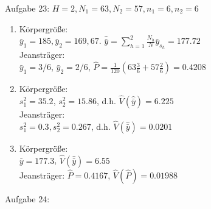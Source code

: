 \begin{Solution}{{Aufgabe 23:}}
$H=2, N_1=63, N_2 = 57, n_1 = 6, n_2 = 6$
\begin{enumerate}
	\item Körpergröße:\\ $\bar{y}_1 = 185, \bar{y}_2 = 169,67$. $\hat{\bar{y}}=\sum_{h=1}^{2}\frac{N_h}{N}\bar{y}_{s_h} = 177.72$\\
	Jeansträger:\\
	$\bar{y}_1=3/6$, $\bar{y}_2=2/6$, $\hat{P}=\frac{1}{120}(63\frac{3}{6}+57\frac{2}{6})=0.4208$
	\item Körpergröße:\\ $s_1^2 = 35.2$, $s_2^2 = 15.86$, d.h. $\hat{V}(\hat{\bar{y}}) = 6.225$\\
	Jeansträger:\\ $s_1^2=0.3, s_2^2=0.267$, d.h. $\hat{V}(\hat{\bar{y}}) = 0.0201$
	\item Körpergröße:\\ $\bar{y}=177.3$, $\hat{V}(\hat{\bar{y}})=6.55$\\
	Jeansträger: $\hat{P}=0.4167$, $\hat{V}(\hat{P})=0.01988$
\end{enumerate}
\end{Solution}
\begin{Solution}{{Aufgabe 24:}}

\end{Solution}
